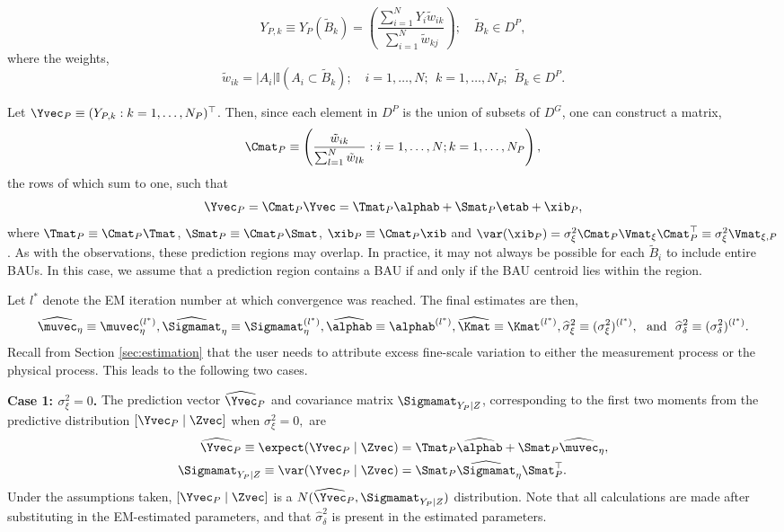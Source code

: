 \begin{equation*}
Y_{P,k} \equiv Y_{P}(\tilde{B}_k) = \left(\frac{\sum_{i =1}^N Y_i \tilde w_{ik}}{\sum_{i=1}^N \tilde w_{kj}}\right); \quad \tilde{B}_k \in D^P,
\end{equation*}
where the weights,
$$ \tilde w_{ik} = |A_i|\mathbb{I}(A_i \subset \tilde{B}_k); \quad i = 1,\dots,N;~~k = 1,\dots, N_P; ~~\tilde{B}_k \in D^P.$$

Let $\Yvec_P \equiv (Y_{P,k} : k = 1,\dots,N_P)^\top$. Then, since each element in $D^P$ is the union of subsets of $D^G$, one can construct a matrix,
\begin{equation}\label{eq:CP}
\Cmat_P \equiv \left(\frac{\tilde w_{ik}}{\sum_{l=1}^N \tilde w_{lk}} : i = 1,\dots,N; k = 1,\dots,N_P\right),
\end{equation}
the rows of which sum to one, such that
\begin{equation*}
\Yvec_P = \Cmat_P\Yvec = \Tmat_P\alphab + \Smat_P\etab + \xib_P,
\end{equation*}
where $\Tmat_P \equiv \Cmat_P \Tmat$, $\Smat_P \equiv \Cmat_P \Smat$, $\xib_P \equiv \Cmat_P \xib$ and $\var(\xib_P) = \sigma^2_\xi\Cmat_P\Vmat_\xi\Cmat_P^\top \equiv \sigma^2_\xi\Vmat_{\xi,P}$.  As with the observations, these prediction regions may overlap. In practice, it may not always be possible for each $\tilde{B}_i$ to include entire BAUs. In this case, we assume that a prediction region contains a BAU if and only if the BAU centroid lies within the region.

Let $l^*$ denote the EM iteration number at which convergence was reached. The final estimates are then,
$$\widehat\muvec_\eta \equiv \muvec_\eta^{(l^*)}, \widehat\Sigmamat_\eta \equiv \Sigmamat_\eta^{(l^*)}, \widehat\alphab \equiv \alphab^{(l^*)}, \widehat\Kmat \equiv \Kmat^{(l^*)}, \widehat\sigma^2_\xi \equiv (\sigma^2_\xi)^{(l^*)}, \textrm{~~and~~} \widehat\sigma^2_\delta \equiv (\sigma^2_\delta)^{(l^*)}.$$
Recall from Section \ref{sec:estimation} that the user needs to attribute excess fine-scale variation to either the measurement process or the physical process. This leads to the following two cases.

{\bf Case 1: $\sigma^2_\xi = 0$.} The prediction vector $\widehat\Yvec_P$ and covariance matrix $\Sigmamat_{Y_P\mid Z}$, corresponding to the first two moments from the predictive distribution $[\Yvec_P \mid \Zvec]$ when $\sigma^2_\xi = 0,$ are
\begin{align*}
\widehat\Yvec_P \equiv \expect(\Yvec_P \mid \Zvec) &= \Tmat_P\widehat\alphab + \Smat_P\widehat\muvec_\eta, \\%
\Sigmamat_{Y_P \mid Z} \equiv \var(\Yvec_P\mid \Zvec) &= \Smat_P \widehat\Sigmamat_\eta\Smat_P^\top. %
\end{align*}
 Under the assumptions taken, $[\Yvec_P \mid \Zvec]$ is a $N(\widehat\Yvec_P,\Sigmamat_{Y_P \mid Z})$ distribution. Note that all calculations are made after substituting in the EM-estimated parameters, and that $\widehat\sigma^2_\delta$ is present in the estimated parameters.


